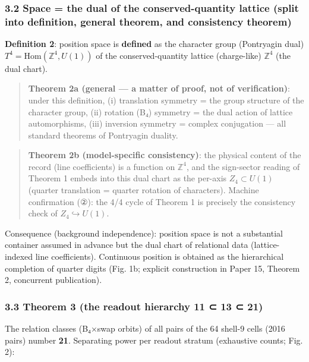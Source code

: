 \documentclass[
]{article}
\begin{document}
\subsubsection{3.2 Space = the dual of the conserved-quantity lattice
(split into definition, general theorem, and consistency
theorem)}\label{space-the-dual-of-the-conserved-quantity-lattice-split-into-definition-general-theorem-and-consistency-theorem}

\textbf{Definition 2}: position space is \textbf{defined} as the
character group (Pontryagin dual)
\(T^4=\mathrm{Hom}(\mathbb{Z}^4,U(1))\) of the conserved-quantity
lattice (charge-like) \(\mathbb{Z}^4\) (the dual chart).

\begin{quote}
\textbf{Theorem 2a (general --- a matter of proof, not of
verification)}: under this definition, (i) translation symmetry = the
group structure of the character group, (ii) rotation (B₄) symmetry =
the dual action of lattice automorphisms, (iii) inversion symmetry =
complex conjugation --- all standard theorems of Pontryagin duality.
\end{quote}

\begin{quote}
\textbf{Theorem 2b (model-specific consistency)}: the physical content
of the record (line coefficients) is a function on \(\mathbb{Z}^4\), and
the sign-sector reading of Theorem 1 embeds into this dual chart as the
per-axis \(Z_4\subset U(1)\) (quarter translation = quarter rotation of
characters). Machine confirmation (②): the 4/4 cycle of Theorem 1 is
precisely the consistency check of \(Z_4\hookrightarrow U(1)\).
\end{quote}

Consequence (background independence): position space is not a
substantial container assumed in advance but the dual chart of
relational data (lattice-indexed line coefficients). Continuous position
is obtained as the hierarchical completion of quarter digits (Fig. 1b;
explicit construction in Paper 15, Theorem 2, concurrent publication).

\subsubsection{3.3 Theorem 3 (the readout hierarchy 11 ⊂ 13 ⊂
21)}\label{theorem-3-the-readout-hierarchy-11-13-21}

The relation classes (B₄×swap orbits) of all pairs of the 64 shell-9
cells (2016 pairs) number \textbf{21}. Separating power per readout
stratum (exhaustive counts; Fig. 2):
\end{document}
